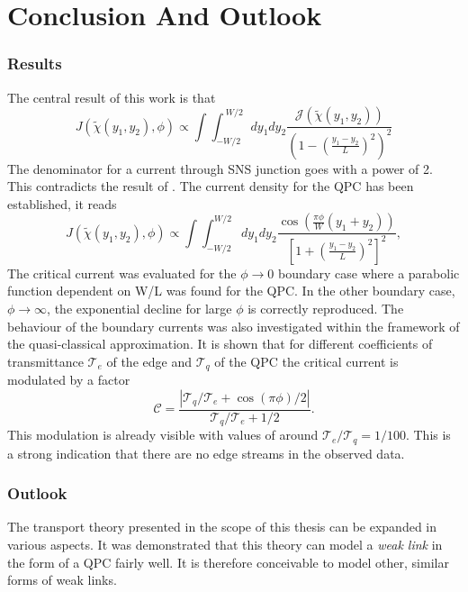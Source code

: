 \chapter{Conclusion And Outlook}
\label{ch:conclusion}

\subsection*{Results}
The central result of this work is that
\begin{equation}
J(\tilde{\chi}(y_1, y_2), \phi) \propto \int \int_{-W/2}^{~W/2} dy_1 dy_2 \frac{ \mathcal{J}(\tilde{\chi}(y_1, y_2)) }{ \left( 1 - \left(\frac{y_1 - y_2}{L}\right)^2 \right)^2 }
\end{equation}
The denominator for a current through SNS junction goes with a power of 2. This contradicts the result of \cite{Barzykin1999}. 
The current density for the QPC has been established, it reads
\begin{equation}
J(\tilde{\chi}(y_1, y_2), \phi) \propto \int \int_{-W/2}^{W/2} d y_1 d y_2 \frac{\cos \left( \frac{\pi \phi}{W}(y_1 + y_2) \right)}{\left[ 1 + \left(\frac{y_1 - y_2}{L}\right)^2\right]^2} \label{eq:josephson_current},
\end{equation}
The critical current was evaluated for the $\phi \rightarrow 0$ boundary case where a parabolic function dependent on W/L was found for the QPC. In the other boundary case, $\phi \rightarrow \infty$, the exponential decline for large $\phi$ is correctly reproduced. The behaviour of the boundary currents was also investigated within the framework of the quasi-classical approximation. It is shown that for different coefficients of transmittance $\mathcal{T}_e$ of the edge and $\mathcal{T}_q$ of the QPC the critical current is modulated by a factor 
\begin{equation}
\mathcal{C} =  \frac{| \mathcal{T}_q / \mathcal{T}_e + \cos \left( \pi \phi \right)/2 |}{\mathcal{T}_q / \mathcal{T}_e + 1/2}.
\end{equation}
This modulation is already visible with values of around $\mathcal{T}_e/ \mathcal{T}_q = 1 / 100$. This is a strong indication that there are no edge streams in the observed data. 
 
\subsection*{Outlook}

The transport theory presented in the scope of this thesis can be expanded in various aspects. It was demonstrated that this theory can model a \emph{weak link} in the form of a QPC fairly well. It is therefore conceivable to model other, similar forms of weak links.

